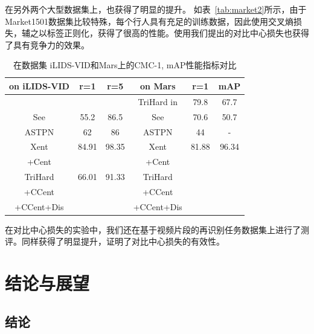在另外两个大型数据集上，也获得了明显的提升。
如表~\ref{tab:market2}所示，由于Market1501数据集比较特殊，每个行人具有充足的训练数据，因此使用交叉熵损失，辅之以标签正则化，获得了很高的性能。使用我们提出的对比中心损失也获得了具有竞争力的效果。

\begin{table}
	\centering
	\caption{在数据集 iLIDS-VID和Mars上的CMC-1, mAP性能指标对比}
	\label{tab:mars2}
	\begin{tabular}{c|cc||c|cc}
		\hline
		on  iLIDS-VID              & r=1   & r=5   & on Mars                              & r=1   & mAP   \\ \hline  
		                           &       &       & TriHard in \cite{hermans2017defense} & 79.8  & 67.7  \\ 
		See  \cite{zhou2017see}    & 55.2  & 86.5  & See                                  & 70.6  & 50.7  \\  
		ASTPN \cite{xu2017jointly} & 62    & 86    & ASTPN                                & 44    & -     \\ 
		Xent                       & 84.91 & 98.35 & Xent                                 & 81.88 & 96.34 \\
		+Cent                      &       &       & +Cent                                &       &       \\ 		
		TriHard                    & 66.01     & 91.33   & TriHard                              & & \\
		+CCent                     & & & +CCent                               & & \\
		+CCent+Dis                 & &    & +CCent+Dis                           &       &       \\  \hline 
	\end{tabular}
\end{table}

在对比中心损失的实验中，我们还在基于视频片段的再识别任务数据集上进行了测评。同样获得了明显提升，证明了对比中心损失的有效性。

\chapter{结论与展望}

\section{结论}


